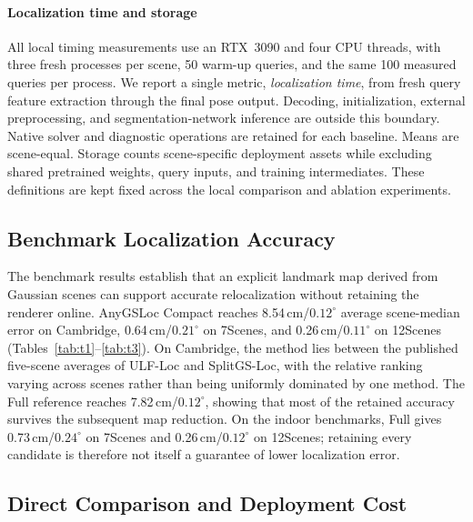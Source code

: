 \paragraph{Localization time and storage}
All local timing measurements use an RTX~3090 and four CPU threads, with three fresh processes per scene, 50 warm-up queries, and the same 100 measured queries per process. We report a single metric, \emph{localization time}, from fresh query feature extraction through the final pose output. Decoding, initialization, external preprocessing, and segmentation-network inference are outside this boundary. Native solver and diagnostic operations are retained for each baseline. Means are scene-equal. Storage counts scene-specific deployment assets while excluding shared pretrained weights, query inputs, and training intermediates. These definitions are kept fixed across the local comparison and ablation experiments.



\subsection{Benchmark Localization Accuracy}
\label{sec:accuracy}




The benchmark results establish that an explicit landmark map derived from Gaussian scenes can support accurate relocalization without retaining the renderer online. AnyGSLoc Compact reaches 8.54\,cm/$0.12^\circ$ average scene-median error on Cambridge, 0.64\,cm/$0.21^\circ$ on 7Scenes, and 0.26\,cm/$0.11^\circ$ on 12Scenes (Tables~\ref{tab:t1}--\ref{tab:t3}). On Cambridge, the method lies between the published five-scene averages of ULF-Loc and SplitGS-Loc, with the relative ranking varying across scenes rather than being uniformly dominated by one method. The Full reference reaches 7.82\,cm/$0.12^\circ$, showing that most of the retained accuracy survives the subsequent map reduction. On the indoor benchmarks, Full gives 0.73\,cm/$0.24^\circ$ on 7Scenes and 0.26\,cm/$0.12^\circ$ on 12Scenes; retaining every candidate is therefore not itself a guarantee of lower localization error.

\subsection{Direct Comparison and Deployment Cost}
\label{sec:local-comparison}




